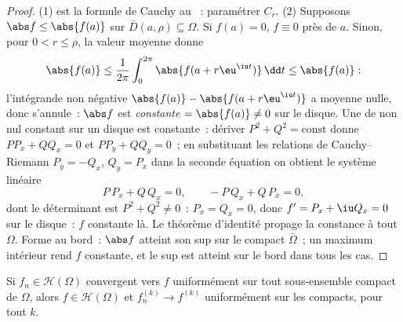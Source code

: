 \begin{proof}
(1) est la formule de Cauchy au ~: paramétrer $C_r$.
(2) Supposons $\abs f \leq \abs{f(a)}$ sur $\bar D(a, \rho)
\subseteq \Omega$. Si $f(a) = 0$, $f \equiv 0$ près de $a$.
Sinon, pour $0 < r \leq \rho$, la valeur moyenne donne
\[
\abs{f(a)} \leq \frac1{2\pi}\int_0^{2\pi}\abs{f(a +
r\eu^{\iu t})}\,\dd t \leq \abs{f(a)} :
\]
l'intégrande  non négative $\abs{f(a)} - \abs{f(a +
r\eu^{\iu t})}$ a moyenne nulle, donc s'annule~: $\abs f$ est
\emph{constante} $= \abs{f(a)} \ne 0$ sur le disque. Une
 de  non nul constant sur un disque
est constante~: dériver $P^2 + Q^2 = \text{const}$ donne
$PP_x + QQ_x = 0$ et $PP_y + QQ_y = 0$~; en substituant les
relations de Cauchy--Riemann $P_y = -Q_x$, $Q_y = P_x$ dans la
seconde équation on obtient le système linéaire
\[
P\,P_x + Q\,Q_x = 0, \qquad -P\,Q_x + Q\,P_x = 0,
\]
dont le déterminant est $P^2 + Q^2 \neq 0$~: $P_x = Q_x = 0$,
donc $f' = P_x + \iu Q_x = 0$ sur le disque~: $f$ constante
là. Le théorème d'identité propage la constance à tout
$\Omega$. Forme au bord~: $\abs f$ atteint son sup sur le
compact $\bar\Omega$~; un maximum intérieur rend $f$ constante,
et le sup est atteint sur le bord dans tous les cas.
\end{proof}

\begin{theorem}
\label{thm:b3:holomorphic:weierstrassconv}
Si $f_n \in \mathcal H(\Omega)$ convergent vers $f$ uniformément
sur tout sous-ensemble compact de $\Omega$, alors $f \in
\mathcal H(\Omega)$ et $f_n^{(k)} \to f^{(k)}$ uniformément
sur les compacts, pour tout $k$.
\end{theorem}

